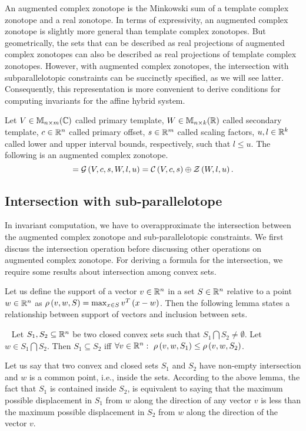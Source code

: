 An augmented complex zonotope is the Minkowski sum of a template
complex zonotope and a real zonotope. In terms of expressivity, an
augmented complex zonotope is slightly more general than template
complex zonotopes.  But geometrically, the sets that can be described
as real projections of augmented complex zonotopes can also be
described as real projections of template complex zonotopes.  However,
with augmented complex zonotopes, the intersection with
subparallelotopic constraints can be succinctly specified, as we will
see latter. Consequently, this representation is more convenient to
derive conditions for computing invariants for the affine hybrid
system.
%
\begin{definition}
Let $V\in\mat{n}{m}{C}$ called primary template, $W\in\mat{n}{k}{R}$
called secondary template, $c\in\mb{R}^n$ called primary offset,
$s\in\mb{R}^m$ called scaling factors, $u,l\in\mb{R}^k$ called lower
and upper interval bounds, respectively, such that $l\leq u$.  The
following is an augmented complex
zonotope.
\begin{equation*}
=\gcz{V}{c}{s}{W}{l}{u} = \cz{V}{c}{s}\oplus\zon{W}{l}{u}.
\end{equation*}
\end{definition}
%
\subsection{Intersection with sub-parallelotope}
In invariant computation, we have to overapproximate the intersection
between the augmented complex zonotope and sub-parallelotopic
constraints.  We first discuss the intersection operation before
discussing other operations on augmented complex zonotope.  For
deriving a formula for the intersection, we require some results about
intersection among convex sets.  

Let us define the support of a vector $v\in\realset^n$ in a set
$S\in\realset^n$ relative to a point $w\in\realset^n$ as
$\support{w}{v}{S}=\max_{x\in S}v^T\lt(x-w\rt)$.   Then the following
lemma states a relationship between support of vectors and inclusion
between sets.
%
\begin{lemma}~\label{supp-inclusion}
Let $S_1,S_2\subseteq \realset^n$ be two closed convex sets such that
$S_1\bigcap S_2\neq \emptyset$.  Let $w\in S_1\bigcap S_2$.
Then $S_1\subseteq S_2$ iff $\forall
v\in\realset^n:~\support{w}{v}{S_1}\leq \support{w}{v}{S_2}$.
\end{lemma}
Let us say that two convex and closed sets $S_1$ and $S_2$ have
non-empty intersection and $w$ is a common point, i.e., inside the
sets.  According to the above lemma, the fact that $S_1$ is contained
inside $S_2$, is equivalent to saying that the maximum possible
displacement in $S_1$ from $w$ along the direction of any
vector $v$ is less than the maximum possible displacement in $S_2$
from $w$ along the direction of the vector $v$.

